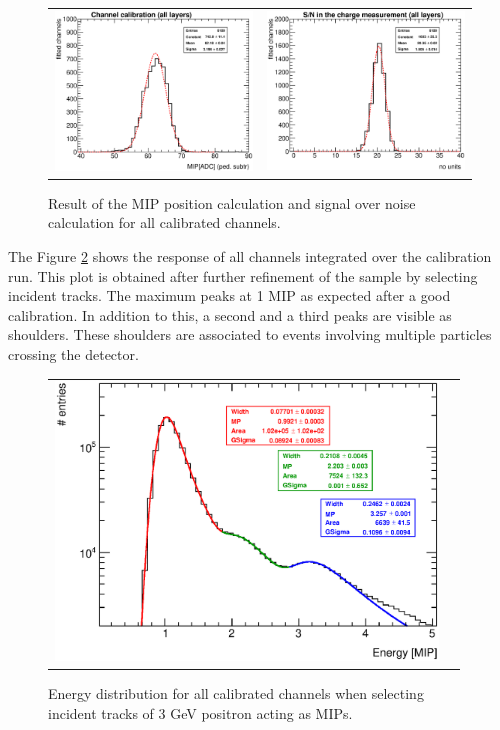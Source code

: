 \documentclass[a4paper,11pt]{article}
\begin{document}
\begin{figure}[!t]
  \centering
  \begin{tabular}{ll}
      \includegraphics[width=2.8in]{../figs/MIP/MIPsummary_title.eps} & \includegraphics[width=2.8in]{../figs/MIP/SNsummary_title.eps}  
  \end{tabular}
\caption{Result of the MIP position calculation and signal over noise calculation for all calibrated channels.}
\label{mipandSN}
\end{figure}

The Figure \ref{mip3peaks} shows the response of all channels integrated over the calibration run.
This plot is obtained after further refinement of the sample by selecting incident tracks.
The maximum peaks at 1 MIP as expected after a good calibration.
In addition to this, a second and a third peaks
are visible as shoulders. These shoulders are associated to 
events involving multiple 
particles crossing the detector.

\begin{figure}[!t]
  \centering 
    \begin{tabular}{ll}
      \includegraphics[width=4in]{../figs/MIP/MIP3peaks.eps} 
    \end{tabular}
    \caption{Energy distribution for all calibrated channels when selecting incident tracks of 3 GeV positron acting as MIPs.}
\label{mip3peaks}
\end{figure}
\end{document}
